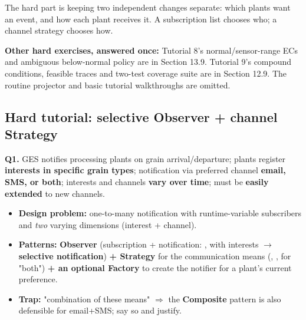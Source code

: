 

\begin{studycolumns}
\vspace{0pt}
\begin{eli5box}The hard part is keeping two independent changes separate: which plants want an event, and how each plant receives it. A subscription list chooses who; a channel strategy chooses how.\end{eli5box}
\textbf{Other hard exercises, answered once:} Tutorial 8's normal/sensor-range ECs and ambiguous below-normal policy are in Section 13.9. Tutorial 9's compound conditions, feasible traces and two-test coverage suite are in Section 12.9. The routine projector and basic tutorial walkthroughs are omitted.
\end{studycolumns}
\Needspace{100pt}
\subsection*{Hard tutorial: selective Observer + channel Strategy}
\begin{studycolumns}
\textbf{Q1.} GES notifies processing plants on grain arrival/\allowbreak{}departure; plants register \textbf{interests in specific grain types}; notification via preferred channel \textbf{email, SMS, or both}; interests and channels \textbf{vary over time}; must be \textbf{easily extended} to new channels.

\begin{itemize}
\item \textbf{Design problem:} one-to-many notification with runtime-variable subscribers and \emph{two} varying dimensions (interest + channel).
\item \textbf{Patterns:} \textbf{Observer} (subscription + notification: ,  with interests \ensuremath{\rightarrow} \textbf{selective notification}) \textbf{+ Strategy} for the communication means (, ,  for "both") \textbf{+ an optional Factory} to create the notifier for a plant's current preference.
\item \textbf{Trap:} "combination of these means" \ensuremath{\Rightarrow} the \textbf{Composite} pattern is also defensible for email+SMS; say so and justify.
\end{itemize}
\end{studycolumns}


